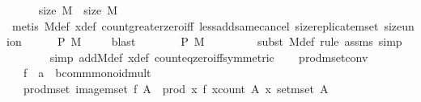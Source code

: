 \begin{isabellebody}
\ \ \ \ \isamarkupfalse%
\ {\isachardoublequoteopen}size\ M{}\ {\isacharless}{\kern0pt}\ size\ M{\isachardoublequoteclose}\isanewline
\ \ \ \ \ \ \isamarkupfalse%
\ {\isacharparenleft}{\kern0pt}metis\ M{\isacharunderscore}{\kern0pt}def\ x{\isacharunderscore}{\kern0pt}def\ count{\isacharunderscore}{\kern0pt}greater{\isacharunderscore}{\kern0pt}zero{\isacharunderscore}{\kern0pt}iff\ less{\isacharunderscore}{\kern0pt}add{\isacharunderscore}{\kern0pt}same{\isacharunderscore}{\kern0pt}cancel{}\ size{\isacharunderscore}{\kern0pt}replicate{\isacharunderscore}{\kern0pt}mset\ size{\isacharunderscore}{\kern0pt}union{\isacharparenright}{\kern0pt}\isanewline
\ \ \ \ \isamarkupfalse%
\ {\isachardoublequoteopen}P\ M{}{\isachardoublequoteclose}\ \isamarkupfalse%
\ {}\ \isamarkupfalse%
\ blast\isanewline
\ \ \ \ \isamarkupfalse%
\ \isamarkupfalse%
\ {\isachardoublequoteopen}P\ M{\isachardoublequoteclose}\ \isanewline
\ \ \ \ \ \ \isamarkupfalse%
\ {\isacharparenleft}{\kern0pt}subst\ M{\isacharunderscore}{\kern0pt}def{\isacharcomma}{\kern0pt}\ rule\ assms{\isacharparenleft}{\kern0pt}{}{\isacharparenright}{\kern0pt}{\isacharcomma}{\kern0pt}\ simp{\isacharparenright}{\kern0pt}\isanewline
\ \ \ \ \ \ \isamarkupfalse%
\ {\isacharparenleft}{\kern0pt}simp\ add{\isacharcolon}{\kern0pt}M{}{\isacharunderscore}{\kern0pt}def\ x{\isacharunderscore}{\kern0pt}def\ count{\isacharunderscore}{\kern0pt}eq{\isacharunderscore}{\kern0pt}zero{\isacharunderscore}{\kern0pt}iff{\isacharbrackleft}{\kern0pt}symmetric{\isacharbrackright}{\kern0pt}{\isacharparenright}{\kern0pt}{\isacharplus}{\kern0pt}\isanewline
\ \ \isamarkupfalse%
\isanewline
{}\isamarkupfalse%
%
\endisatagproof
{\isafoldproof}%
%
\isadelimproof
\isanewline
%
\endisadelimproof
\isanewline
{}\isamarkupfalse%
\ prod{\isacharunderscore}{\kern0pt}mset{\isacharunderscore}{\kern0pt}conv{\isacharcolon}{\kern0pt}\ \isanewline
\ \ \ f\ {\isacharcolon}{\kern0pt}{\isacharcolon}{\kern0pt}\ {\isachardoublequoteopen}{\isacharprime}{\kern0pt}a\ {\isasymRightarrow}\ {\isacharprime}{\kern0pt}b{\isacharcolon}{\kern0pt}{\isacharcolon}{\kern0pt}{\isacharbraceleft}{\kern0pt}comm{\isacharunderscore}{\kern0pt}monoid{\isacharunderscore}{\kern0pt}mult{\isacharbraceright}{\kern0pt}{\isachardoublequoteclose}\isanewline
\ \ \ {\isachardoublequoteopen}prod{\isacharunderscore}{\kern0pt}mset\ {\isacharparenleft}{\kern0pt}image{\isacharunderscore}{\kern0pt}mset\ f\ A{\isacharparenright}{\kern0pt}\ {\isacharequal}{\kern0pt}\ prod\ {\isacharparenleft}{\kern0pt}{\isasymlambda}x{\isachardot}{\kern0pt}\ f\ x{\isacharcircum}{\kern0pt}{\isacharparenleft}{\kern0pt}count\ A\ x{\isacharparenright}{\kern0pt}{\isacharparenright}{\kern0pt}\ {\isacharparenleft}{\kern0pt}set{\isacharunderscore}{\kern0pt}mset\ A{\isacharparenright}{\kern0pt}{\isachardoublequoteclose}\isanewline

\end{isabellebody}
